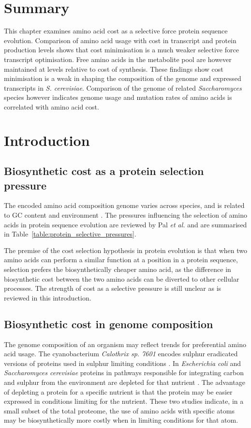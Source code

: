 \section*{Summary}

This chapter examines amino acid cost as a selective force protein sequence evolution. Comparison of amino acid usage with cost in transcript and protein production levels shows that cost minimisation is a much weaker selective force transcript optimisation. Free amino acids in the metabolite pool are however maintained at levels relative to cost of synthesis. These findings show cost minimisation is a weak in shaping the composition of the genome and expressed transcripts in \emph{S. cerevisiae}. Comparison of the genome of related \emph{Saccharomyces} species however indicates genome usage and mutation rates of amino acids is correlated with amino acid cost.
\clearpage

\section{Introduction}

\subsection{Biosynthetic cost as a protein selection pressure}

The encoded amino acid composition genome varies across species, and is related to GC content and environment \cite{tekaia2006}. The pressures influencing the selection of amino acids in protein sequence evolution are reviewed by Pal \emph{et al.} \cite{pal2006} and are summarised in Table~\vref{table:protein_selective_pressures}.

The premise of the cost selection hypothesis in protein evolution \cite{akashi2002} is that when two amino acids can perform a similar function at a position in a protein sequence, selection prefers the biosynthetically cheaper amino acid, as the difference in biosynthetic cost between the two amino acids can be diverted to other cellular processes. The strength of cost as a selective pressure is still unclear as is reviewed in this introduction.

\subsection{Biosynthetic cost in genome composition}

The genome composition of an organism may reflect trends for preferential amino acid usage. The cyanobacterium \emph{Calothrix sp. 7601} encodes sulphur eradicated versions of proteins used in sulphur limiting conditions \cite{mazel1989}. In \emph{Escherichia coli} and \emph{Saccharomyces cerevisiae} proteins in pathways responsible for integrating carbon and sulphur from the environment are depleted for that nutrient \cite{baudoin2001}. The advantage of depleting a protein for a specific nutrient is that the protein may be easier expressed in conditions limiting for the nutrient. These two studies indicate, in a small subset of the total proteome, the use of amino acids with specific atoms may be biosynthetically more costly when in limiting conditions for that atom.

